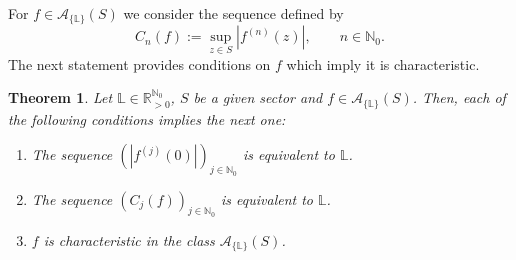 \documentclass[11pt,a4paper]{article}
\theoremstyle{plain}
\newtheorem{theorem}[proposition]{Theorem}
\theoremstyle{definition}
\newcommand{\RR}{\mathbb{R}}
\newcommand{\NN}{\mathbb{N}}
\newcommand{\LL}{\mathbb{L}}
\begin{document}
%
%
%

For $f\in \mathcal{A}_{\{\LL\}}(S)$ we consider the sequence defined by
\begin{equation*}%
	C_n(f):=\sup_{z\in S} |f^{(n)}(z)|, \qquad n\in\NN_0.
\end{equation*}
The next statement provides conditions on $f$ which imply it is characteristic.

\begin{theorem}\label{optthm2}
	Let $\LL\in\RR_{>0}^{\NN_0}$, $S$ be a given sector and $f\in \mathcal{A}_{\{\LL\}} (S)$. Then, each of the following  conditions implies the next one:
	\begin{enumerate}
		\item[$(1)$] The sequence $(|f^{(j)}(0)|)_{j\in\NN_0}$ is equivalent to $\LL$.
		\item[$(2)$] The sequence $(C_j(f))_{j\in\NN_0}$ is equivalent to $\LL$.
		\item[$(3)$] $f$ is characteristic in the class $\mathcal{A}_{\{\LL\}} (S)$.
	\end{enumerate}
\end{theorem}
\end{document}
